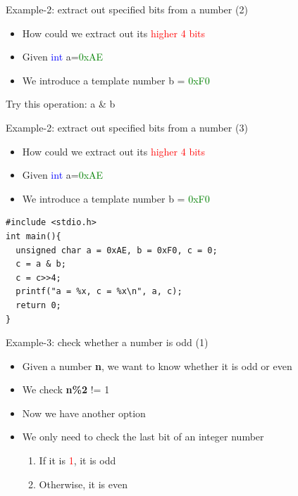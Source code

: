 \begin{frame}{Example-2: extract out specified bits from a number (2)}
\begin{itemize}
	\item {How could we extract out its \textcolor{red}{higher 4 bits}}
	\item{Given \textcolor{blue}{int} a=\textcolor{green}{0xAE}}
	\item {We introduce a template number b = \textcolor{green}{0xF0}}
\end{itemize}
\begin{center}
	\Large{Try this operation: a \& b}
\end{center}
\end{frame}

\begin{frame}[fragile]{Example-2: extract out specified bits from a number (3)}
\begin{itemize}
	\item {How could we extract out its \textcolor{red}{higher 4 bits}}
	\item{Given \textcolor{blue}{int} a=\textcolor{green}{0xAE}}
	\item {We introduce a template number b = \textcolor{green}{0xF0}}
\end{itemize}
\begin{lstlisting}[linewidth=0.7\linewidth]
#include <stdio.h>
int main(){
  unsigned char a = 0xAE, b = 0xF0, c = 0;
  c = a & b;
  c = c>>4;
  printf("a = %x, c = %x\n", a, c);
  return 0;
}
\end{lstlisting}
\end{frame}


\begin{frame}[fragile]{Example-3: check whether  a number is odd (1)}
\begin{itemize}
	\item {Given a number \textbf{n}, we want to know whether it is odd or even}
	\item{We check \textbf{n\%2} != 1}
	\item {Now we have another option}
	\item {We only need to check the last bit of an integer number}
	\begin{enumerate}
		\item {If it is \textcolor{red}{1}, it is odd}
		\item {Otherwise, it is even}
	\end{enumerate}
\end{itemize}

\end{frame}


